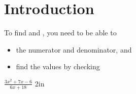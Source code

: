\section{Introduction}

To find   and , 
you need to be able to 
\begin{itemize}[nosep]
    \item {} the numerator and denominator, and 
    \item find the  values by checking 
\end{itemize}

{
    $
    \frac
        {3x^2 + 7x - 6}
        {6x + 18}
    $
}
{2in}

